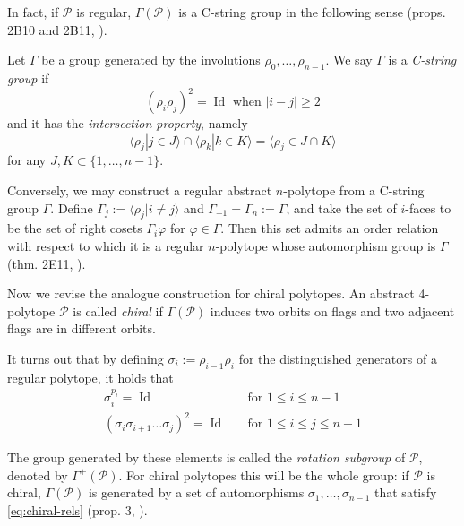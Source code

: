 \documentclass{article}
\theoremstyle{definition}
\newcommand{\p}{\mathcal{P}}
\DeclareMathOperator{\Id}{Id}
\begin{document}
	In fact, if $\p$ is regular, $\Gamma(\p)$ is a C-string group in the following sense (props. 2B10 and 2B11, \cite{abstract-polytopes}).

	Let $\Gamma$ be a group generated by the involutions $\rho_0,\ldots,\rho_{n-1}$. We say $\Gamma$ is a \textit{C-string group} if
	\[(\rho_i\rho_j)^2=\Id\text{ when } |i-j|\geq2\]
	and it has the \textit{intersection property}, namely
	\[\langle \rho_j|j\in J\rangle\cap\langle\rho_k|k\in K\rangle=\langle\rho_j\in J\cap K\rangle\]
	for any $J,K\subset\{1,\ldots,n-1\}$.
	
%	
%	
	Conversely, we may construct a regular abstract $n$-polytope from a C-string group $\Gamma$. Define $\Gamma_j:=\langle\rho_j|i\neq j\rangle$ and $\Gamma_{-1}=\Gamma_n:=\Gamma$, and take the set of $i$-faces to be the set of right cosets $\Gamma_i\varphi$ for $\varphi\in\Gamma$. Then this set admits an order relation with respect to which it is a regular $n$-polytope whose automorphism group is $\Gamma$ (thm. 2E11, \cite{abstract-polytopes}).
	
	\vspace{.5cm}
	
	Now we revise the analogue construction for chiral polytopes. An abstract 4-polytope $\p$ is called \textit{chiral} if $\Gamma(\p)$ induces two orbits on flags and two adjacent flags are in different orbits.
	
	It turns out that by defining $\sigma_i:=\rho_{i-1}\rho_i$ for the distinguished generators of a regular polytope, it holds that
	\begin{equation}\label{eq:chiral-rels}
	\begin{aligned}
			\sigma_i^{p_i}=\Id\quad&\text{for }1\leq i\leq n-1\\
		(\sigma_i\sigma_{i+1}\ldots\sigma_j)^2=\Id\quad&\text{for }1\leq i\leq j\leq n-1
	\end{aligned}
	\end{equation}
	
	The group generated by these elements is called the \textit{rotation subgroup} of $\p$, denoted by $\Gamma^+(\p)$. For chiral polytopes this will be the whole group: if $\p$ is chiral, $\Gamma(\p)$ is generated by a set of automorphisms $\sigma_1,\ldots,\sigma_{n-1}$ that satisfy \cref{eq:chiral-rels} (prop. 3, \cite{schulte-chiral}).
	
\end{document}
